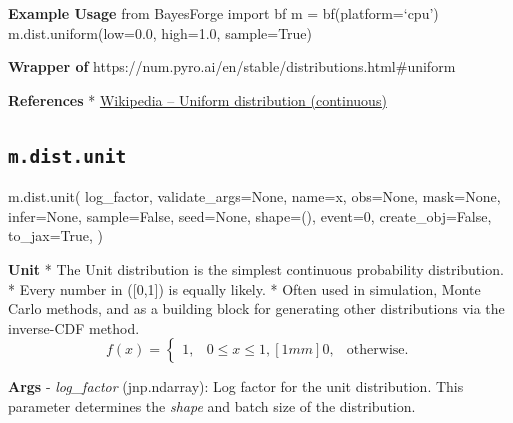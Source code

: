 \documentclass[
  letterpaper,
  DIV=11,
  numbers=noendperiod]{scrartcl}
\newenvironment{Shaded}{\begin{snugshade}}{\end{snugshade}}
\newcommand{\DecValTok}[1]{\textcolor[rgb]{0.68,0.00,0.00}{#1}}
\newcommand{\NormalTok}[1]{\textcolor[rgb]{0.00,0.23,0.31}{#1}}
\newcommand{\OperatorTok}[1]{\textcolor[rgb]{0.37,0.37,0.37}{#1}}
\newcommand{\StringTok}[1]{\textcolor[rgb]{0.13,0.47,0.30}{#1}}
\newcommand{\VariableTok}[1]{\textcolor[rgb]{0.07,0.07,0.07}{#1}}
\begin{document}
\textbf{Example Usage} from BayesForge import bf m = bf(platform=`cpu')
m.dist.uniform(low=0.0, high=1.0, sample=True)

\textbf{Wrapper of}
https://num.pyro.ai/en/stable/distributions.html\#uniform

\textbf{References} *
\href{https://en.wikipedia.org/wiki/Uniform_distribution_\%28continuous\%29}{Wikipedia
-- Uniform distribution (continuous)}

\subsection{\texorpdfstring{\texttt{m.dist.unit}}{m.dist.unit}}\label{unit}

\begin{Shaded}
\begin{Highlighting}[]
\NormalTok{m.dist.unit(}
\NormalTok{    log\_factor,}
\NormalTok{    validate\_args}\OperatorTok{=}\VariableTok{None}\NormalTok{,}
\NormalTok{    name}\OperatorTok{=}\StringTok{\textquotesingle{}x\textquotesingle{}}\NormalTok{,}
\NormalTok{    obs}\OperatorTok{=}\VariableTok{None}\NormalTok{,}
\NormalTok{    mask}\OperatorTok{=}\VariableTok{None}\NormalTok{,}
\NormalTok{    infer}\OperatorTok{=}\VariableTok{None}\NormalTok{,}
\NormalTok{    sample}\OperatorTok{=}\VariableTok{False}\NormalTok{,}
\NormalTok{    seed}\OperatorTok{=}\VariableTok{None}\NormalTok{,}
\NormalTok{    shape}\OperatorTok{=}\NormalTok{(),}
\NormalTok{    event}\OperatorTok{=}\DecValTok{0}\NormalTok{,}
\NormalTok{    create\_obj}\OperatorTok{=}\VariableTok{False}\NormalTok{,}
\NormalTok{    to\_jax}\OperatorTok{=}\VariableTok{True}\NormalTok{,}
\NormalTok{)}
\end{Highlighting}
\end{Shaded}

\textbf{Unit} * The Unit distribution is the simplest continuous
probability distribution. * Every number in ({[}0,1{]}) is equally
likely. * Often used in simulation, Monte Carlo methods, and as a
building block for generating other distributions via the inverse-CDF
method. \[
f(x) =
\begin{cases}
1, & 0 \le x \le 1, [1mm]
0, & \text{otherwise}.
\end{cases}
\]

\textbf{Args} - \emph{log\_factor} (jnp.ndarray): Log factor for the
unit distribution. This parameter determines the \emph{shape} and batch
size of the distribution.
\end{document}
